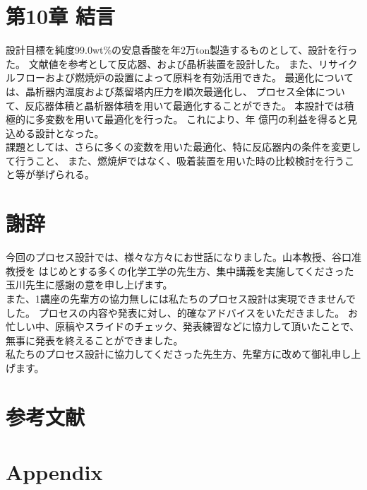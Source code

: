 \documentclass[platex, a4j]{jsarticle}
\begin{document}
\newpage
\section*{第10章 結言}
設計目標を純度99.0wt\%の安息香酸を年2万ton製造するものとして、設計を行った。
文献値を参考として反応器、および晶析装置を設計した。
また、リサイクルフローおよび燃焼炉の設置によって原料を有効活用できた。
最適化については、晶析器内温度および蒸留塔内圧力を順次最適化し、
プロセス全体について、反応器体積と晶析器体積を用いて最適化することができた。
本設計では積極的に多変数を用いて最適化を行った。
これにより、年 億円の利益を得ると見込める設計となった。\\
課題としては、さらに多くの変数を用いた最適化、特に反応器内の条件を変更して行うこと、
また、燃焼炉ではなく、吸着装置を用いた時の比較検討を行うこと等が挙げられる。

\newpage
\section*{謝辞}
今回のプロセス設計では、様々な方々にお世話になりました。山本教授、谷口准教授を
はじめとする多くの化学工学の先生方、集中講義を実施してくださった玉川先生に感謝の意を申し上げます。\\
また、1講座の先輩方の協力無しには私たちのプロセス設計は実現できませんでした。
プロセスの内容や発表に対し、的確なアドバイスをいただきました。
お忙しい中、原稿やスライドのチェック、発表練習などに協力して頂いたことで、無事に発表を終えることができました。\\
私たちのプロセス設計に協力してくださった先生方、先輩方に改めて御礼申し上げます。

\newpage
\section*{参考文献}

\newpage
\section*{Appendix}
\end{document}
